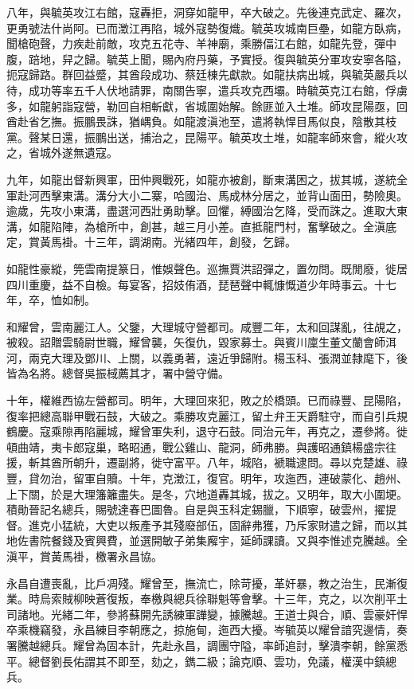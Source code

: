 \begin{pinyinscope}
八年，與毓英攻江右館，寇轟拒，洞穿如龍甲，卒大破之。先後連克武定、羅次，更勇號法什尚阿。已而澂江再陷，城外寇勢復熾。毓英攻城南巨壘，如龍方臥病，聞槍砲聲，力疾赴前敵，攻克五花寺、羊神廟，乘勝偪江右館，如龍先登，彈中腹，踣地，舁之歸。毓英上聞，賜內府丹藥，予實授。復與毓英分軍攻安寧各隘，扼寇歸路。群回益蹙，其酋段成功、蔡廷棟先獻款。如龍扶病出城，與毓英嚴兵以待，成功等率五千人伏地請罪，南關告寧，遣兵攻克西壩。時毓英克江右館，俘虜多，如龍躬詣寇營，勒回自相斬獻，省城圍始解。餘匪並入土堆。師攻昆陽亟，回酋赴省乞撫。振鵬畏誅，猶嵎負。如龍渡滇池至，遣將執悍目馬似良，陰散其枝黨。聲某日還，振鵬出送，捕治之，昆陽平。毓英攻土堆，如龍率師來會，縱火攻之，省城外遂無遺寇。

九年，如龍出督新興軍，田仲興戰死，如龍亦被創，斷東溝困之，拔其城，遂統全軍赴河西擊東溝。溝分大小二寨，哈國治、馬成林分居之，並背山面田，勢險奧。逾歲，先攻小東溝，盡選河西壯勇助擊。回懼，縛國治乞降，受而誅之。進取大東溝，如龍陷陣，為槍所中，創甚，越三月小差。直抵龍門村，奮擊破之。全滇底定，賞黃馬褂。十三年，調湖南。光緒四年，創發，乞歸。

如龍性豪縱，筦雲南提篆日，惟娛聲色。巡撫賈洪詔彈之，置勿問。既閒廢，徙居四川重慶，益不自檢。每宴客，招妓侑酒，琵琶聲中輒慷慨道少年時事云。十七年，卒，恤如制。

和耀曾，雲南麗江人。父鑒，大理城守營都司。咸豐二年，太和回謀亂，往覘之，被殺。詔贈雲騎尉世職，耀曾襲，矢復仇，毀家募士。與賓川廩生董文蘭會師洱河，兩克大理及鄧川、上關，以義勇著，遠近爭歸附。楊玉科、張潤並隸麾下，後皆為名將。總督吳振棫薦其才，署中營守備。

十年，權維西協左營都司。明年，大理回來犯，敗之於橋頭。已而祿豐、昆陽陷，復率把總高聯甲戰石鼓，大破之。乘勝攻克麗江，留土弁王天爵駐守，而自引兵規鶴慶。寇乘隙再陷麗城，耀曾軍失利，退守石鼓。同治元年，再克之，遷參將。徙頓曲靖，夷卡郎寇巢，略昭通，戰公雞山、龍洞，師弗勝。與護昭通鎮楊盛宗往援，斬其酋所朝升，遷副將，徙守富平。八年，城陷，褫職逮問。尋以克楚雄、祿豐，貸勿治，留軍自贖。十年，克澂江，復官。明年，攻迤西，連破蒙化、趙州、上下關，於是大理籓籬盡失。是冬，穴地道轟其城，拔之。又明年，取大小圍埂。積勛晉記名總兵，賜號達春巴圖魯。自是與玉科定錫臘，下順寧，破雲州，擢提督。進克小猛統，大吏以叛產予其殘廢部伍，固辭弗獲，乃斥家財遣之歸，而以其地佐書院餐錢及賓興費，並選開敏子弟集廨宇，延師課讀。又與李惟述克騰越。全滇平，賞黃馬褂，檄署永昌協。

永昌自遭喪亂，比戶凋殘。耀曾至，撫流亡，除苛擾，革奸暴，教之治生，民漸復業。時烏索賊柳映蒼復叛，奉檄與總兵徐聯魁等會擊。十三年，克之，以次削平土司諸地。光緒二年，參將蘇開先誘練軍譁變，據騰越。王道士與合，順、雲豪奸悍卒乘機竊發，永昌練目李朝應之，掠施甸，迤西大擾。岑毓英以耀曾諳究邊情，奏署騰越總兵。耀曾為固本計，先赴永昌，調團守隘，率師追討，擊潰李朝，餘黨悉平。總督劉長佑謂其不即至，劾之，鐫二級；論克順、雲功，免議，權漢中鎮總兵。


\end{pinyinscope}
